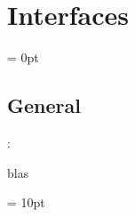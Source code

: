 
\section{Interfaces} 


\parskip = 0pt

\vspace{3mm} \subsection*{General}

: 

blas
\vspace{2mm}

\vspace{5mm}\parskip = 10pt 
